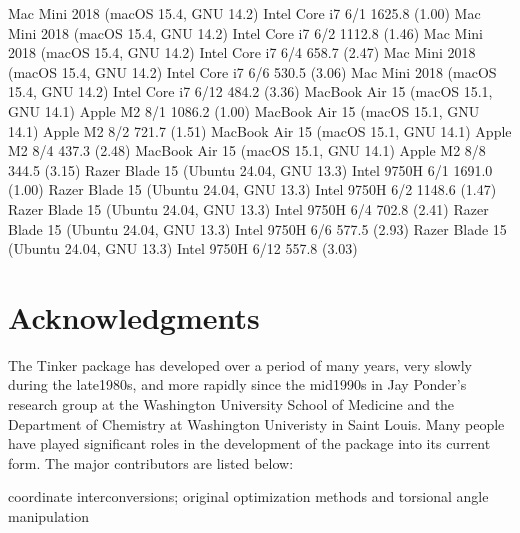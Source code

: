\documentclass[letterpaper,11pt,english]{sphinxmanual}
\begin{document}
\begin{sphinxVerbatim}[commandchars=\\\{\}]
Mac Mini 2018 (macOS 15.4, GNU 14.2)      Intel Core i7       6/1      1625.8 (1.00)
Mac Mini 2018 (macOS 15.4, GNU 14.2)      Intel Core i7       6/2      1112.8 (1.46)
Mac Mini 2018 (macOS 15.4, GNU 14.2)      Intel Core i7       6/4       658.7 (2.47)
Mac Mini 2018 (macOS 15.4, GNU 14.2)      Intel Core i7       6/6       530.5 (3.06)
Mac Mini 2018 (macOS 15.4, GNU 14.2)      Intel Core i7      6/12       484.2 (3.36)
MacBook Air 15 (macOS 15.1, GNU 14.1)        Apple M2         8/1      1086.2 (1.00)
MacBook Air 15 (macOS 15.1, GNU 14.1)        Apple M2         8/2       721.7 (1.51)
MacBook Air 15 (macOS 15.1, GNU 14.1)        Apple M2         8/4       437.3 (2.48)
MacBook Air 15 (macOS 15.1, GNU 14.1)        Apple M2         8/8       344.5 (3.15)
Razer Blade 15 (Ubuntu 24.04, GNU 13.3)    Intel 9750H        6/1      1691.0 (1.00)
Razer Blade 15 (Ubuntu 24.04, GNU 13.3)    Intel 9750H        6/2      1148.6 (1.47)
Razer Blade 15 (Ubuntu 24.04, GNU 13.3)    Intel 9750H        6/4       702.8 (2.41)
Razer Blade 15 (Ubuntu 24.04, GNU 13.3)    Intel 9750H        6/6       577.5 (2.93)
Razer Blade 15 (Ubuntu 24.04, GNU 13.3)    Intel 9750H       6/12       557.8 (3.03)
\end{sphinxVerbatim}

\sphinxstepscope


\chapter{Acknowledgments}
\label{\detokenize{text/acknowledgements:acknowledgments}}\label{\detokenize{text/acknowledgements::doc}}
\sphinxAtStartPar
The Tinker package has developed over a period of many years, very slowly during the late\sphinxhyphen{}1980s, and more rapidly since the mid\sphinxhyphen{}1990s in Jay Ponder’s research group at the Washington University School of Medicine and the Department of Chemistry at Washington Univeristy in Saint Louis. Many people have played significant roles in the development of the package into its current form. The major contributors are listed below:

\sphinxAtStartPar
{}

\sphinxAtStartPar
coordinate interconversions; original optimization methods and torsional angle manipulation

\sphinxAtStartPar
{}
\end{document}
